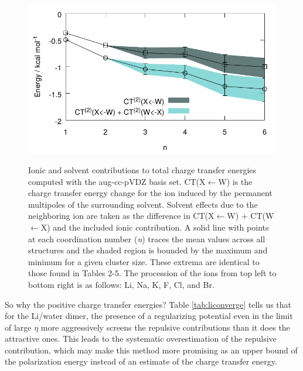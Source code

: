 \begin{sie}
\begin{figure}
\begin{center}
  \includegraphics[width=0.48\linewidth]{images/ct_energy_data/e2ind_ct2_plots/pdf/br-ct.pdf} \\
 \end{center}
 \caption[Separate ion and solvent contributions to charge transfer energy]{\label{fig:ct_energy}Ionic and solvent contributions to total 
 charge transfer energies computed with the aug-cc-pVDZ basis set.
 CT(X$\leftarrow$W) is the charge transfer energy change for the ion induced by the permanent multipoles of the surrounding 
 solvent. Solvent effects due to the neighboring ion are taken as the difference in CT(X$\leftarrow$W) + CT(W$\leftarrow$X) 
 and the included ionic contribution. A solid line with points at each coordination number (\emph{n}) traces the mean values across all 
 structures and the shaded region is bounded by the maximum and minimum for a given cluster size. These extrema are identical to those found 
 in Tables 2-5. The procession of the ions from top left to bottom right is as follows: Li\sur{+}, Na\sur{+}, K\sur{+}, F\sur{-}, 
 Cl\sur{-}, and Br\sur{-}.}
\end{figure}

  So why the positive charge transfer energies? Table \ref{tab:liconverge} tells us that for the Li\sur{+}/water dimer, the presence of a regularizing
  potential even in the limit of large $\eta$ more aggressively screens the repulsive contributions than it does the attractive ones. This leads to the 
  systematic overestimation of the repulsive contribution, which may make this method more promising as an upper bound of the polarization energy instead 
  of an estimate of the charge transfer energy.
  

\end{sie}
